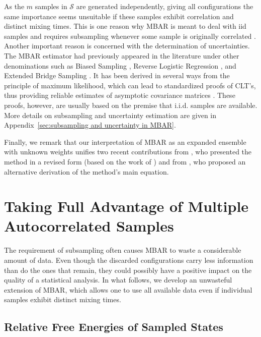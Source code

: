 \documentclass[journal=jctcce,manuscript=article,layout=twocolumn]{achemso}
\begin{document}
As the $m$ samples in $\mathcal S$ are generated independently, giving all configurations the same importance seems unsuitable if these samples exhibit correlation and distinct mixing times. This is one reason why MBAR is meant to deal with iid samples and requires subsampling whenever some sample is originally correlated \cite{Shirts_2008}. Another important reason is concerned with the determination of uncertainties. The MBAR estimator had previously appeared in the literature under other denominations such as Biased Sampling \cite{Vardi_1985, Gill_1988}, Reverse Logistic Regression \cite{Geyer_1994}, and Extended Bridge Sampling \cite{Meng_1996, Kong_2003, Tan_2004}. It has been derived in several ways from the principle of maximum likelihood, which can lead to standardized proofs of CLT's, thus providing reliable estimates of asymptotic covariance matrices \cite{Pawitan_2001, Greene_2012}. These proofs, however, are usually based on the premise that i.i.d. samples are available. More details on subsampling and uncertainty estimation are given in Appendix~\ref{sec:subsampling and uncertainty in MBAR}.

Finally, we remark that our interpretation of MBAR as an expanded ensemble with unknown weights unifies two recent contributions from \citeauthor{Shirts_2017} \cite{Shirts_2017}, who presented the method in a revised form (based on the work of \citeauthor{Geyer_1994} \cite{Geyer_1994}) and from \citeauthor{Ding_2017} \cite{Ding_2017}, who proposed an alternative derivation of the method's main equation.

\section{Taking Full Advantage of Multiple Autocorrelated Samples}

The requirement of subsampling often causes MBAR to waste a considerable amount of data. Even though the discarded configurations carry less information than do the ones that remain, they could possibly have a positive impact on the quality of a statistical analysis. In what follows, we develop an unwasteful extension of MBAR, which allows one to use all available data even if individual samples exhibit distinct mixing times.

\subsection{Relative Free Energies of Sampled States}
\end{document}
